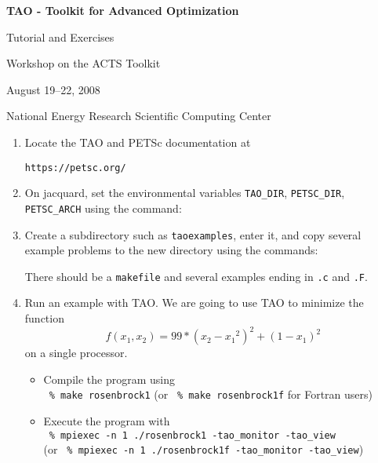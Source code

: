 \documentclass[11pt]{article}
\begin{document}
\begin{center}
{\bf
TAO - Toolkit for Advanced Optimization

Tutorial and Exercises

\vspace{0.25in}

Workshop on the ACTS Toolkit

August 19--22, 2008

National Energy Research Scientific Computing Center
}
\end{center}
\vspace{0.25in}

\begin{enumerate}

\item Locate the TAO and PETSc documentation at
\begin{alltt}
https://petsc.org/
\end{alltt}

\item On jacquard, set the environmental variables
\texttt{TAO\_DIR}, \texttt{PETSC\_DIR}, \texttt{PETSC\_ARCH}
using the command:
\begin{alltt}
% module load tao/1.9_g_c++
\end{alltt}

\item Create a subdirectory such as \texttt{taoexamples}, enter it, and copy several example problems to the new directory using the commands:
\begin{alltt}
% mkdir taoexamples
% cd taoexamples
% cp -R \$TAO_DIR/src/unconstrained/tutorials/* .
% ls
\end{alltt}
There should be a \texttt{makefile} and several examples ending in \texttt{.c} and \texttt{.F}.

\item Run an example with TAO.
We are going to use TAO to minimize the function
\[
    f(x_1,x_2) = 99*(x_2-{x_1}^2)^2 + (1-x_1)^2
\]
on a single processor.
\begin{itemize}

 \item Compile the program using \\
  \quad \texttt{ \% make rosenbrock1}
  (or \texttt{ \% make rosenbrock1f} for Fortran users)

 \item Execute the program with \\
  \quad \texttt{ \% mpiexec -n 1 ./rosenbrock1 -tao\_monitor -tao\_view} \\
  (or \texttt{ \% mpiexec -n 1 ./rosenbrock1f -tao\_monitor -tao\_view}) \\


\end{itemize}
\end{enumerate}
\end{document}

